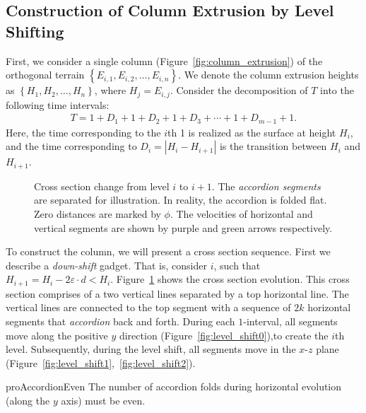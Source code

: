 \subsection{Construction of Column Extrusion by Level Shifting}
\label{sec:column_extrusion}

First, we consider a single column (Figure~\ref{fig:column_extrusion})
of the orthogonal terrain $\left\{ E_{i,1}, E_{i,2}, \dots, E_{i,n} \right\}$.
We denote the column extrusion heights as $\left\{ H_1, H_2,\dots, H_n \right\}$, where $H_j = E_{i,j}$.
Consider the decomposition of $T$ into the following time intervals:%
\begin{align}
    \label{eq:column_decomposition}
T = 1 + D_1  +  1 + D_2  +  1 + D_3  +\cdots +  1 + D_{m-1}  +  1.
\end{align}
Here, the time corresponding to the $i$th 1 is realized as the surface at height $H_i$,
and the time corresponding to $D_i = \left| H_i-H_{i+1}\right|$ is the transition between $H_i$ and $H_{i+1}$.

\graphicspath{{./figures/}}
\begin{figure}[htb]
    \def\svgwidth{1.0\textwidth}
    \caption{
    Cross section change from level $i$ to $i+1$. The \emph{accordion segments} are separated for illustration.
    In reality, the accordion is folded flat. Zero distances are marked by $\phi$.
    The velocities of horizontal and vertical segments are shown by purple and green arrows respectively.
    }
    \label{fig:level_shift_layers}
\end{figure}

%

To construct the column, we will present a cross section sequence. First we describe a \emph{down-shift} gadget.
That is, consider $i$, such that $H_{i+1} = H_i-2\varepsilon\cdot d < H_i$.
Figure~\ref{fig:level_shift_layers} shows the cross section evolution.
This cross section comprises of a two vertical lines separated by a top horizontal line.
The vertical lines are connected to the top segment with
a sequence of $2k$ horizontal segments that \emph{accordion} back and forth.
During each $1$-interval, all segments move along the positive $y$ direction (Figure~\ref{fig:level_shift0}),to create the $i$th level.
Subsequently, during the level shift, all segments move in the $x$-$z$ plane (Figure~\ref{fig:level_shift1},~\ref{fig:level_shift2}).
\begin{restatable}{pro}{AccordionEven}
\label{pro:accordion_even}
The number of accordion folds during horizontal evolution (along the $y$ axis) must be even.
\end{restatable}

